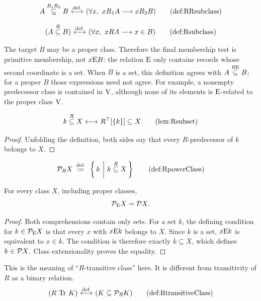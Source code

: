 \begin{definition}[$R_1R_2$ subclass]
\[
A\stackrel{R_1R_2}{\subclass} B \iffdef  (\forall x,\ xR_1A\implies xR_2B)
\labeltagd{def}{RRsubclass}
\]
\end{definition}
\begin{definition}[$R$ subclass]
\[
(A\stackrel{R}{\subclass} B)
\iffdef
(\forall x,\ xRA\implies x\in B)
\labeltagd{def}{Rsubclass}
\]
\end{definition}
The target $B$ may be a proper class. Therefore the final membership
test is primitive membership, not $x\mathrm{E} B$: the relation $\mathrm{E}$ only
contains records whose second coordinate is a set. When $B$ is a set,
this definition agrees with $A\stackrel{R\mathrm{E}}{\subseteq}B$; for a
proper $B$ those expressions need not agree. For example, a nonempty
predecessor class is contained in $\mathrm{V}$, although none of its elements
is $\mathrm{E}$-related to the proper class $\mathrm{V}$.
\begin{lemma}[$R$ subclass]
\[
k\stackrel{R}{\subclass} X \iff  R^{\top}[\{k\}]\subclass X
\labeltagd{lem}{Rsubset}
\]
\end{lemma}
\begin{proof}
Unfolding the definition, both sides say that every $R$-predecessor of $k$
belongs to $X$.
\end{proof}
\begin{definition}
\[
\power_R X\ \eqdef\ \cc{ k}{k\stackrel{R}{\subclass}X}
\labeltagd{def}{RpowerClass}
\]
\end{definition}
\begin{lemma}
For every class $X$, including proper classes,
\[
\mathcal{P}_{\mathrm{E}}X=\mathcal{P} X.
\]
\end{lemma}
\begin{proof}
Both comprehensions contain only sets. For a set $k$, the defining
condition for $k\in\mathcal{P}_{\mathrm{E}}X$ is that every $x$ with $x\mathrm{E} k$
belongs to $X$. Since $k$ is a set, $x\mathrm{E} k$ is equivalent to
$x\in k$. The condition is therefore exactly $k\subseteq X$,
which defines $k\in\mathcal{P} X$. Class extensionality proves the equality.
\end{proof}

\begin{definition}
This is the meaning of ``$R$-transitive class'' here. It is different from
transitivity of $R$ as a binary relation.
\[
(R\ \Tr\ K)
\iffdef
(K\subclass \power_R K)
\labeltagd{def}{RtransitiveClass}
\]
\end{definition}

